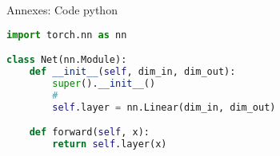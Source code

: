 \documentclass[12pt]{beamer}
\begin{document}

\begin{frame}[fragile]{Annexes: Code python}
\footnotesize
\begin{tcolorbox}[colback=white,boxsep=2mm,arc=1pt,
    auto outer arc,left=1mm,right=1mm,top=1mm,bottom=1mm,boxrule=0.5pt,width=\textwidth]
\begin{lstlisting}[language=python]
import torch.nn as nn

class Net(nn.Module):  
    def __init__(self, dim_in, dim_out):
        super().__init__()
        #
        self.layer = nn.Linear(dim_in, dim_out)

    def forward(self, x):
        return self.layer(x)
\end{lstlisting}
\end{tcolorbox}
\normalsize
\end{frame}



\end{document}
